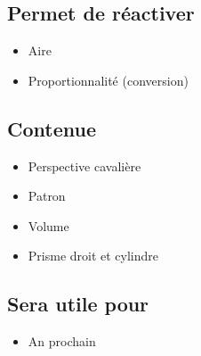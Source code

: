 \subsection{Permet de réactiver}
\begin{itemize}
    \item Aire
    \item Proportionnalité (conversion)
\end{itemize}

\subsection{Contenue}
\begin{itemize}
    \item Perspective cavalière
    \item Patron
    \item Volume
    \item Prisme droit et cylindre
\end{itemize}

\subsection{Sera utile pour}
\begin{itemize}
    \item An prochain
\end{itemize}